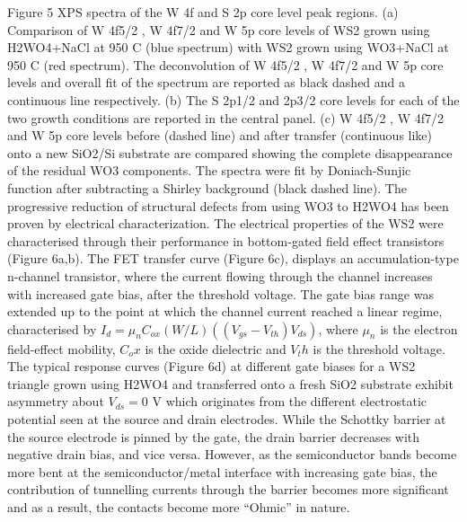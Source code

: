 \documentclass[12pt]{article}
\begin{document}
Figure 5 XPS spectra of the W 4f and S 2p core level peak regions. (a) Comparison  of W 4f5/2 , W 4f7/2  and W 5p core levels of WS2 grown using H2WO4+NaCl at 950 {\degree}C (blue spectrum) with WS2 grown using WO3+NaCl at 950 {\degree}C (red spectrum). The deconvolution of W 4f5/2 , W 4f7/2  and W 5p core levels and overall fit of the spectrum are reported as black dashed and a continuous line respectively. (b) The S 2p1/2 and 2p3/2 core levels for each of the two growth conditions are reported in the central panel. (c) W 4f5/2 , W 4f7/2  and W 5p core levels before (dashed line) and after transfer (continuous like) onto a new SiO2/Si substrate are compared showing the complete disappearance of the residual WO3 components. The spectra were fit by Doniach-Sunjic function after subtracting a Shirley background (black dashed line).
The progressive reduction of structural defects from using WO3 to H2WO4 has been proven by electrical characterization. The electrical properties of the WS2 were characterised through their performance in bottom-gated field effect transistors (Figure 6a,b). The FET transfer curve (Figure 6c), displays an accumulation-type n-channel transistor, where the current flowing through the channel increases with increased gate bias, after the threshold voltage. The gate bias range was extended up to the point at which the channel current reached a linear regime, characterised by $I_d = {\mu}_nC_{ox}(W/L) ((V_{gs}-V_{th})V_{ds})$, where ${\mu}_n$ is the electron field-effect mobility, $C_ox$ is the oxide dielectric and $V_th$ is the threshold voltage. The typical response curves (Figure 6d) at different gate biases for a WS2 triangle grown using H2WO4 and transferred onto a fresh SiO2 substrate exhibit asymmetry about $V_{ds}=0$ V which originates from the different electrostatic potential seen at the source and drain electrodes. While the Schottky barrier at the source electrode is pinned by the gate, the drain barrier decreases with negative drain bias, and vice versa. However, as the semiconductor bands become more bent at the semiconductor/metal interface with increasing gate bias, the contribution of tunnelling currents through the barrier becomes more significant and as a result, the contacts become more “Ohmic” in nature. 
 
\end{document}

